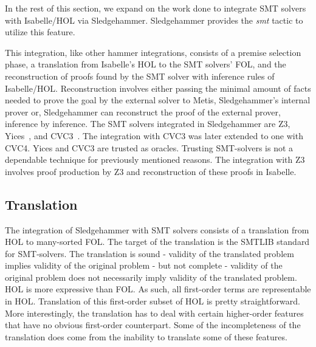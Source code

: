 \documentclass{article}
\begin{document}
	In the rest of this section, we expand on the work 
	done to integrate SMT solvers with Isabelle/HOL via 
	Sledgehammer. Sledgehammer provides the \textit{smt}
	tactic to utilize this feature.
	
	This integration, like other hammer integrations, 
	consists of a premise selection phase, a translation 
	from Isabelle's HOL to the SMT solvers' FOL, and the 
	reconstruction of proofs found by the SMT solver with 
	inference rules of Isabelle/HOL. Reconstruction involves 
	either passing the minimal amount of facts needed 
	to prove the goal by the external solver to Metis, 
	Sledgehammer's internal prover or, Sledgehammer 
	can reconstruct the proof of the external prover, 
	inference by inference.	The SMT solvers integrated in 
	Sledgehammer are Z3, Yices~\cite{Dutertre:cav2014}, 
	and CVC3~\cite{10.5555/1770351.1770397}. The 
	integration with CVC3 was later extended to 
	one with CVC4. Yices and CVC3 
	are trusted as oracles.	Trusting SMT-solvers is 
	not a dependable technique for previously mentioned 
	reasons. The integration with Z3 involves proof 
	production by Z3 and reconstruction of these proofs 
	in Isabelle.
	
	\subsection{Translation}
		The integration of Sledgehammer with SMT solvers 
		consists of a translation from HOL 
		to many-sorted FOL. The target 
		of the translation is the SMTLIB standard for 
		SMT-solvers. The translation is sound - 
		validity of the translated problem implies 
		validity of the original problem - but not 
		complete - validity of the original problem 
		does not necessarily imply validity of the 
		translated problem. HOL is more expressive 
		than FOL. As such, all first-order terms 
		are representable in HOL. Translation of this 
		first-order subset of HOL is pretty straightforward. 
		More interestingly, the translation has to deal 
		with certain higher-order features that have 
		no obvious first-order counterpart. Some of 
		the incompleteness of the translation does 
		come from the inability to translate some 
		of these features.
		
\end{document}
